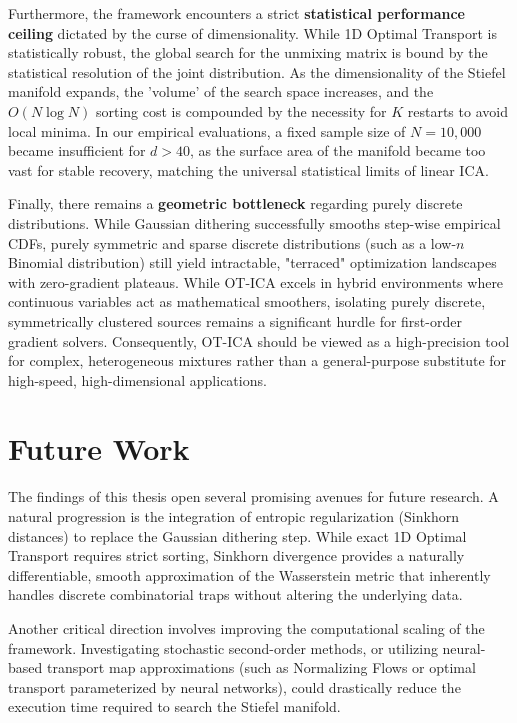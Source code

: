 \documentclass[12pt,a4paper,twoside,openany]{book}
\begin{document}
Furthermore, the framework encounters a strict \textbf{statistical performance ceiling} dictated by the curse of dimensionality. While 1D Optimal Transport is statistically robust, 
the global search for the unmixing matrix is bound by the statistical resolution of the joint distribution. As the dimensionality of the Stiefel manifold expands, 
the 'volume' of the search space increases, and the $O(N \log N)$ sorting cost is compounded by the necessity for $K$ restarts to avoid local minima. 
In our empirical evaluations, a fixed sample size of $N=10,000$ became insufficient for $d > 40$, as the surface area of the manifold became too vast for stable recovery, 
matching the universal statistical limits of linear ICA.

Finally, there remains a \textbf{geometric bottleneck} regarding purely discrete distributions. While Gaussian dithering successfully smooths step-wise empirical CDFs, 
purely symmetric and sparse discrete distributions (such as a low-$n$ Binomial distribution) still yield intractable, "terraced" optimization landscapes with zero-gradient plateaus. 
While OT-ICA excels in hybrid environments where continuous variables act as mathematical smoothers, isolating purely discrete, symmetrically clustered sources remains 
a significant hurdle for first-order gradient solvers. Consequently, OT-ICA should be viewed as a high-precision tool for complex, heterogeneous mixtures rather than 
a general-purpose substitute for high-speed, high-dimensional applications.

\section{Future Work}
The findings of this thesis open several promising avenues for future research. A natural progression is the integration of entropic regularization (Sinkhorn distances) 
to replace the Gaussian dithering step. While exact 1D Optimal Transport requires strict sorting, Sinkhorn divergence provides a naturally differentiable, 
smooth approximation of the Wasserstein metric that inherently handles discrete combinatorial traps without altering the underlying data.

Another critical direction involves improving the computational scaling of the framework. Investigating stochastic second-order methods, 
or utilizing neural-based transport map approximations (such as Normalizing Flows or optimal transport parameterized by neural networks), 
could drastically reduce the execution time required to search the Stiefel manifold. 
\end{document}
